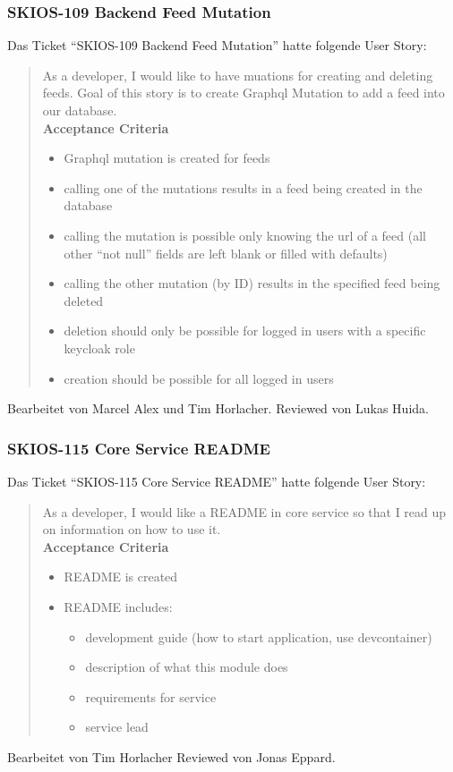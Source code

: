 \subsubsection{SKIOS-109 Backend Feed Mutation}
Das Ticket \enquote{SKIOS-109 Backend Feed Mutation} hatte folgende User Story:
\begin{quotation}
As a developer, I would like to have muations for creating and deleting feeds.
Goal of this story is to create Graphql Mutation to add a feed into our database. \\
\textbf{Acceptance Criteria}
\begin{itemize}
    \item Graphql mutation is created for feeds
    \item calling one of the mutations results in a feed being created in the database
    \item calling the mutation is possible only knowing the url of a feed (all other “not null” fields are left blank or filled with defaults)
    \item calling the other mutation (by ID) results in the specified feed being deleted
    \item deletion should only be possible for logged in users with a specific keycloak role
    \item creation should be possible for all logged in users
\end{itemize}
\end{quotation}
Bearbeitet von Marcel Alex und Tim Horlacher.
Reviewed von Lukas Huida.

\subsubsection{SKIOS-115 Core Service README}
Das Ticket \enquote{SKIOS-115 Core Service README} hatte folgende User Story:
\begin{quotation}
    As a developer, I would like a README in core service so that I read up on information on how to use it. \\
\textbf{Acceptance Criteria}
\begin{itemize}
    \item README is created
    \item README includes:
    \begin{itemize}
        \item development guide (how to start application, use devcontainer)
        \item description of what this module does
        \item requirements for service
        \item service lead
    \end{itemize}
\end{itemize}
\end{quotation}
Bearbeitet von Tim Horlacher
Reviewed von Jonas Eppard.

